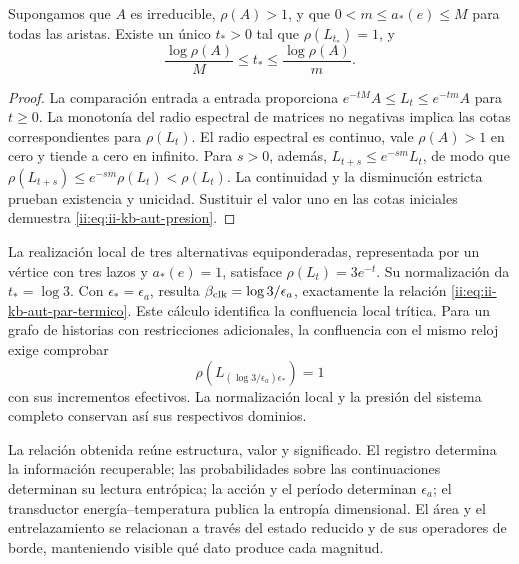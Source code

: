 \begin{proposition}
Supongamos que \(A\) es irreducible, \(\rho(A)>1\), y que
\(0<m\leq a_*(e)\leq M\) para todas las aristas. Existe un único
\(t_*>0\) tal que \(\rho(L_{t_*})=1\), y
\begin{equation}
 \frac{\log\rho(A)}{M}\leq t_*\leq
 \frac{\log\rho(A)}{m}.
 \label{ii:eq:ii-kb-aut-presion}
\end{equation}
\end{proposition}
\begin{proof}
La comparación entrada a entrada proporciona
\(e^{-tM}A\leq L_t\leq e^{-tm}A\) para \(t\geq0\).
La monotonía del radio espectral de matrices no negativas implica
las cotas correspondientes para \(\rho(L_t)\). El radio espectral
es continuo, vale \(\rho(A)>1\) en cero y tiende a cero en infinito.
Para \(s>0\), además,
\(L_{t+s}\leq e^{-sm}L_t\), de modo que
\(\rho(L_{t+s})\leq e^{-sm}\rho(L_t)<\rho(L_t)\).
La continuidad y la disminución estricta prueban existencia y
unicidad. Sustituir el valor uno en las cotas iniciales demuestra
\eqref{ii:eq:ii-kb-aut-presion}.
\end{proof}

La realización local de tres alternativas equiponderadas, representada
por un vértice con tres lazos y \(a_*(e)=1\), satisface
\(\rho(L_t)=3e^{-t}\). Su normalización da \(t_*=\log3\).
Con \(\epsilon_*=\epsilon_a\), resulta
\(\beta_{\rm clk}=\log3/\epsilon_a\), exactamente la relación
\eqref{ii:eq:ii-kb-aut-par-termico}. Este cálculo identifica la
confluencia local trítica. Para un grafo de historias con restricciones
adicionales, la confluencia con el mismo reloj exige comprobar
\[
 \rho\!\left(L_{(\log3/\epsilon_a)\epsilon_*}\right)=1
\]
con sus incrementos efectivos. La normalización local y la presión
del sistema completo conservan así sus respectivos dominios.

La relación obtenida reúne estructura, valor y significado. El registro
determina la información recuperable; las probabilidades sobre las
continuaciones determinan su lectura entrópica; la acción y el período
determinan \(\epsilon_a\); el transductor energía--temperatura
publica la entropía dimensional. El área y el entrelazamiento se
relacionan a través del estado reducido y de sus operadores de borde,
manteniendo visible qué dato produce cada magnitud.
